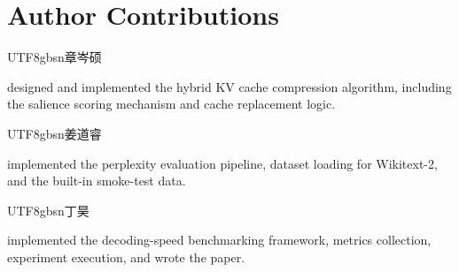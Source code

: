 \documentclass{article}
\begin{document}
\section*{Author Contributions}
\begin{CJK}{UTF8}{gbsn}章岑硕\end{CJK} designed and implemented the hybrid KV cache compression algorithm, including the salience scoring mechanism and cache replacement logic. \begin{CJK}{UTF8}{gbsn}姜道睿\end{CJK} implemented the perplexity evaluation pipeline, dataset loading for Wikitext-2, and the built-in smoke-test data. \begin{CJK}{UTF8}{gbsn}丁昊\end{CJK} implemented the decoding-speed benchmarking framework, metrics collection, experiment execution, and wrote the paper.
\end{document}
